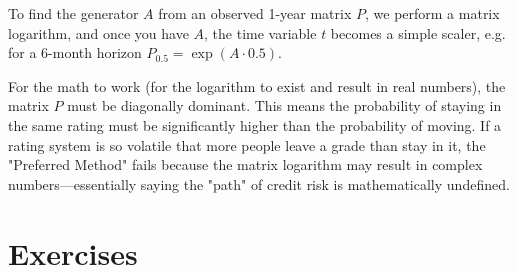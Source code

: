 To find the generator $A$ from an observed 1-year matrix $P$, we perform a matrix logarithm, and once you have $A$, the time variable $t$ becomes a simple scaler, e.g. for a 6-month horizon $P_{0.5} = \exp(A\cdot 0.5)$.

For the math to work (for the logarithm to exist and result in real numbers), the matrix $P$ must be diagonally dominant. This means the probability of staying in the same rating must be significantly higher than the probability of moving. If a rating system is so volatile that more people leave a grade than stay in it, the "Preferred Method" fails because the matrix logarithm may result in complex numbers—essentially saying the "path" of credit risk is mathematically undefined.

\section*{Exercises}










